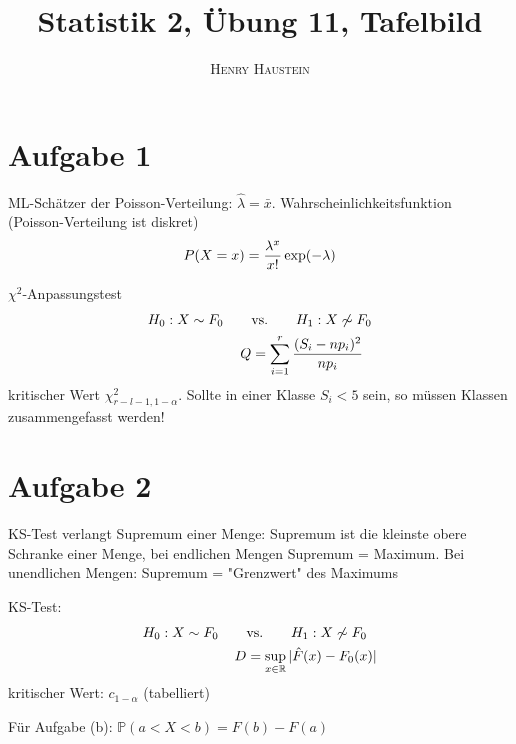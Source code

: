 \documentclass{article}
\title{\textbf{Statistik 2, Übung 11, Tafelbild}}
\author{\textsc{Henry Haustein}}
\date{}
\begin{document}
	\maketitle
	
	\section*{Aufgabe 1}
	ML-Schätzer der Poisson-Verteilung: $\hat{\lambda} = \bar{x}$. Wahrscheinlichkeitsfunktion (Poisson-Verteilung ist diskret)
	\begin{align}
		P(X = x) = \frac{\lambda^x}{x!}\exp(-\lambda) \notag
	\end{align}
	
	$\chi^2$-Anpassungstest
	\begin{align}
		H_0: X \sim F_0 \qquad&\text{vs.}\qquad H_1: X \not\sim F_0 \notag \\
		Q &= \sum_{i=1}^r \frac{(S_i - np_i)^2}{np_i} \notag
	\end{align}
	kritischer Wert $\chi^2_{r-l-1,1-\alpha}$. Sollte in einer Klasse $S_i < 5$ sein, so müssen Klassen zusammengefasst werden!
	
	\section*{Aufgabe 2}
	KS-Test verlangt Supremum einer Menge: Supremum ist die kleinste obere Schranke einer Menge, bei endlichen Mengen Supremum = Maximum. Bei unendlichen Mengen: Supremum = "Grenzwert" des Maximums
	
	KS-Test:
	\begin{align}
		H_0: X \sim F_0 \qquad&\text{vs.}\qquad H_1: X \not\sim F_0 \notag \\
		D &= \sup_{x\in\mathbb{R}} \vert \hat{F}(x) - F_0(x)\vert \notag
	\end{align}
	kritischer Wert: $c_{1-\alpha}$ (tabelliert)
	
	Für Aufgabe (b): $\mathbb{P}(a < X < b) = F(b) - F(a)$
	
\end{document}
